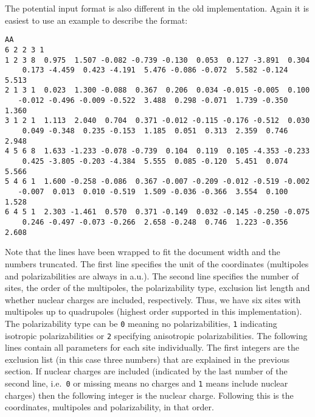 The potential input format is also different in the old implementation.
Again it is easiest to use an example to describe the format:
\begin{verbatim}
AA
6 2 2 3 1
1 2 3 8  0.975  1.507 -0.082 -0.739 -0.130  0.053  0.127 -3.891  0.304
    0.173 -4.459  0.423 -4.191  5.476 -0.086 -0.072  5.582 -0.124  5.513
2 1 3 1  0.023  1.300 -0.088  0.367  0.206  0.034 -0.015 -0.005  0.100
   -0.012 -0.496 -0.009 -0.522  3.488  0.298 -0.071  1.739 -0.350  1.360
3 1 2 1  1.113  2.040  0.704  0.371 -0.012 -0.115 -0.176 -0.512  0.030
    0.049 -0.348  0.235 -0.153  1.185  0.051  0.313  2.359  0.746  2.948
4 5 6 8  1.633 -1.233 -0.078 -0.739  0.104  0.119  0.105 -4.353 -0.233
    0.425 -3.805 -0.203 -4.384  5.555  0.085 -0.120  5.451  0.074  5.566
5 4 6 1  1.600 -0.258 -0.086  0.367 -0.007 -0.209 -0.012 -0.519 -0.002
   -0.007  0.013  0.010 -0.519  1.509 -0.036 -0.366  3.554  0.100  1.528
6 4 5 1  2.303 -1.461  0.570  0.371 -0.149  0.032 -0.145 -0.250 -0.075
    0.246 -0.497 -0.073 -0.266  2.658 -0.248  0.746  1.223 -0.356  2.608
\end{verbatim}
Note that the lines have been wrapped to fit the document width and the numbers
truncated. The first line specifies the unit of the coordinates (multipoles
and polarizabilities are always in a.u.). The second line specifies the number
of sites, the order of the multipoles, the polarizability type, exclusion list 
length and whether nuclear charges are included, respectively. Thus, we have 
six sites with multipoles up to quadrupoles (highest order supported in this 
implementation). The polarizability type can be \verb|0| meaning no 
polarizabilities, \verb|1| indicating isotropic polarizabilities or \verb|2| 
specifying anisotropic polarizabilities. The following lines contain all 
parameters for each site individually. The first integers are the exclusion 
list (in this case three numbers) that are explained in the previous section. 
If nuclear charges are included (indicated by the last number of the second 
line, i.e.\ \verb|0| or missing means no charges and \verb|1| means include 
nuclear charges) then the following integer is the nuclear charge. Following this is 
the coordinates, multipoles and polarizability, in that order.